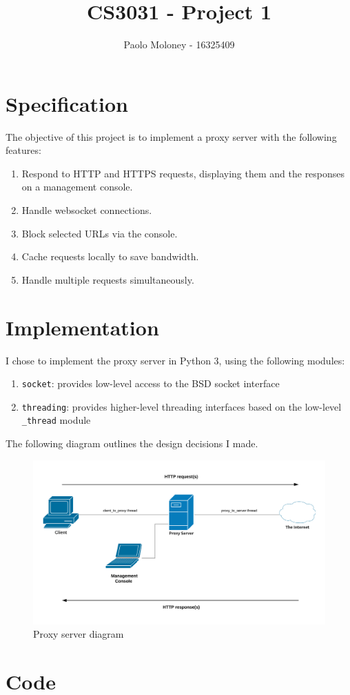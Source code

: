 \documentclass{article}
\title{CS3031 - Project 1}
\author{Paolo Moloney - 16325409}
\begin{document}
\maketitle
\newpage

\tableofcontents
\newpage

\section{Specification}

The objective of this project is to implement a proxy server with the following features:

\begin{enumerate}
	\item Respond to HTTP and HTTPS requests, displaying them and the responses on a management console.
	\item Handle websocket connections.
	\item Block selected URLs via the console.
	\item Cache requests locally to save bandwidth.
	\item Handle multiple requests simultaneously.
\end{enumerate}

\newpage

\section{Implementation}

I chose to implement the proxy server in Python 3, using the following modules:

\begin{enumerate}
	\item \texttt{socket}: provides low-level access to the BSD socket interface
	\item \texttt{threading}: provides higher-level threading interfaces based on the low-level \texttt{\_thread} module
\end{enumerate}

The following diagram outlines the design decisions I made.

\begin{figure}[h]
	\includegraphics[width=\linewidth]{proxy_diagram.png}
	\caption{Proxy server diagram}
	\label{fig:diagram}
\end{figure}

\newpage

\section{Code}

\end{document}
